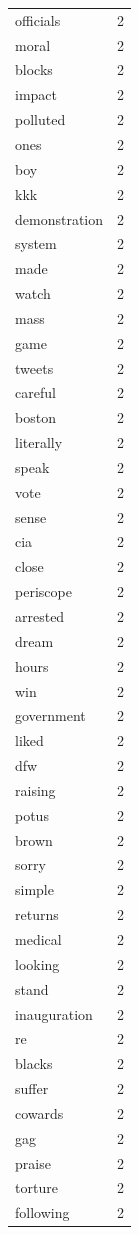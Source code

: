 \begin{tabular}{lr}
officials & 2 \\
moral & 2 \\
blocks & 2 \\
impact & 2 \\
polluted & 2 \\
ones & 2 \\
boy & 2 \\
kkk & 2 \\
demonstration & 2 \\
system & 2 \\
made & 2 \\
watch & 2 \\
mass & 2 \\
game & 2 \\
tweets & 2 \\
careful & 2 \\
boston & 2 \\
literally & 2 \\
speak & 2 \\
vote & 2 \\
sense & 2 \\
cia & 2 \\
close & 2 \\
periscope & 2 \\
arrested & 2 \\
dream & 2 \\
hours & 2 \\
win & 2 \\
government & 2 \\
liked & 2 \\
dfw & 2 \\
raising & 2 \\
potus & 2 \\
brown & 2 \\
sorry & 2 \\
simple & 2 \\
returns & 2 \\
medical & 2 \\
looking & 2 \\
stand & 2 \\
inauguration & 2 \\
re & 2 \\
blacks & 2 \\
suffer & 2 \\
cowards & 2 \\
gag & 2 \\
praise & 2 \\
torture & 2 \\
following & 2 \\

\end{tabular}
